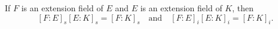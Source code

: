 If $F$ is an extension field of $E$ and $E$ is an extension field of $K$, then
$$[F : E]_s [E : K]_s = [F : K]_s \quad \text{and} \quad [F : E]_i [E : K]_i = [F : K]_i.$$
